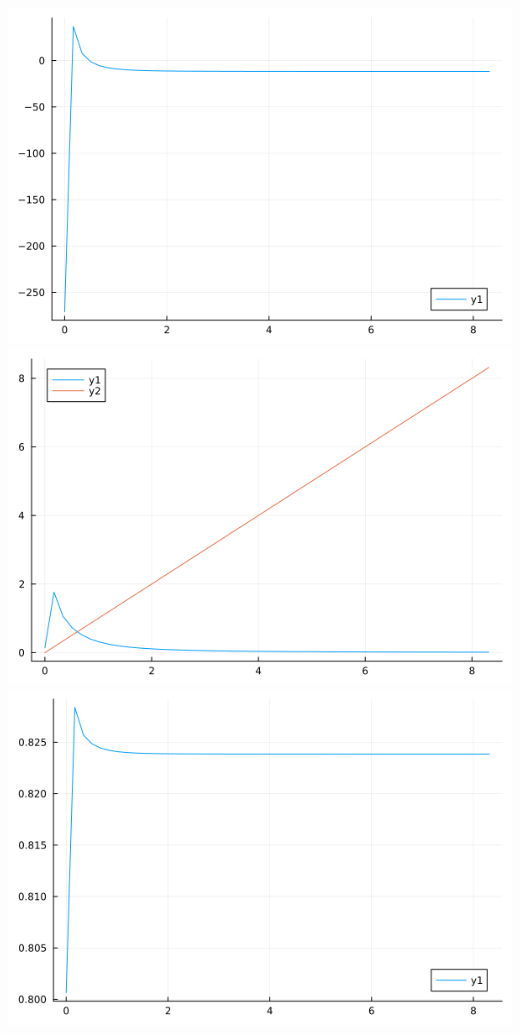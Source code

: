 \documentclass{article}
\begin{document}
\includegraphics[scale = 0.5]{valuec.png}\\
\includegraphics[scale = 0.5]{capitalc.png}\\
\includegraphics[scale = 0.5]{labourc.png}\\
\end{document}
